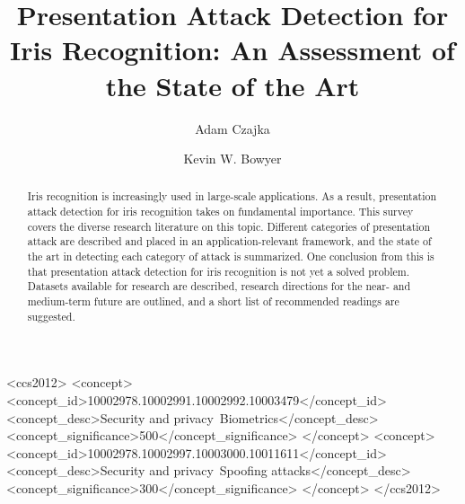 \documentclass[format=acmsmall, review=false, timestamp=false]{acmart}
\begin{document}
\title{Presentation Attack Detection for Iris Recognition: An Assessment of the State of the Art}

\author{Adam Czajka}
\author{Kevin W. Bowyer}

\renewcommand\shortauthors{Czajka A. and Bowyer K. W.}

\begin{abstract}
Iris recognition is increasingly used in large-scale applications. As a result, presentation attack detection for iris recognition takes on fundamental importance. This survey covers the diverse research literature on this topic. Different categories of presentation attack are described and placed in an application-relevant framework, and the state of the art in detecting each category of attack is summarized. One conclusion from this is that presentation attack detection for iris recognition is not yet a solved problem. Datasets available for research are described, research directions for the near- and medium-term future {are outlined}, and a short list of recommended readings are suggested.
\end{abstract}

%
%
\begin{CCSXML}
<ccs2012>
<concept>
<concept_id>10002978.10002991.10002992.10003479</concept_id>
<concept_desc>Security and privacy~Biometrics</concept_desc>
<concept_significance>500</concept_significance>
</concept>
<concept>
<concept_id>10002978.10002997.10003000.10011611</concept_id>
<concept_desc>Security and privacy~Spoofing attacks</concept_desc>
<concept_significance>300</concept_significance>
</concept>
</ccs2012>
\end{CCSXML}

%
%
\end{document}
